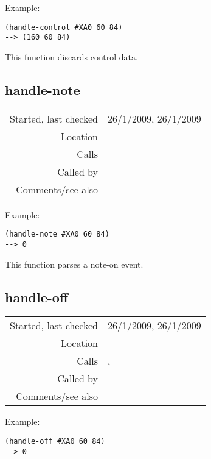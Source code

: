 \vspace{0.5cm}
\noindent Example:
\begin{verbatim}
(handle-control #XA0 60 84)
--> (160 60 84)
\end{verbatim}

\noindent This function discards control data.


\subsection*{handle-note}\label{fun:handle-note}

\vspace{0.3cm}
\begin{tabular}{r|p{8cm}}
Started, last checked & 26/1/2009, 26/1/2009 \\
Location & \nameref{sec:MIDI-import} \\
Calls & \nameref{fun:ticks-ms} \\
Called by & \nameref{fun:parse-events} \\
Comments/see also &
\end{tabular}

\vspace{0.5cm}
\noindent Example:
\begin{verbatim}
(handle-note #XA0 60 84)
--> 0
\end{verbatim}

\noindent This function parses a note-on event.


\subsection*{handle-off}\label{fun:handle-off}

\vspace{0.3cm}
\begin{tabular}{r|p{8cm}}
Started, last checked & 26/1/2009, 26/1/2009 \\
Location & \nameref{sec:MIDI-import} \\
Calls & \nameref{fun:match-note}, \nameref{fun:ticks-ms} \\
Called by & \nameref{fun:parse-events} \\
Comments/see also &
\end{tabular}

\vspace{0.5cm}
\noindent Example:
\begin{verbatim}
(handle-off #XA0 60 84)
--> 0
\end{verbatim}

